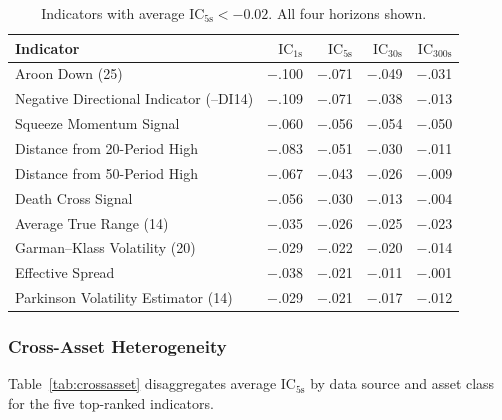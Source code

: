 \documentclass[12pt,a4paper]{article}
\theoremstyle{definition}
\theoremstyle{remark}
\newcommand{\IC}{\mathrm{IC}}
\begin{document}
\begin{table}[H]
\centering
\caption{Indicators with average $\IC_{5\text{s}} < -0.02$.
  All four horizons shown.}
\label{tab:negIC}
\small
{}
\begin{tabular}{lrrrr}
\toprule
\textbf{Indicator} & $\IC_{1\text{s}}$ & $\IC_{5\text{s}}$
  & $\IC_{30\text{s}}$ & $\IC_{300\text{s}}$ \\
\midrule
Aroon Down (25)   & $-$.100 & $-$.071 & $-$.049 & $-$.031 \\
Negative Directional Indicator (--DI14)           & $-$.109 & $-$.071 & $-$.038 & $-$.013 \\
Squeeze Momentum Signal   & $-$.060 & $-$.056 & $-$.054 & $-$.050 \\
Distance from 20-Period High    & $-$.083 & $-$.051 & $-$.030 & $-$.011 \\
Distance from 50-Period High    & $-$.067 & $-$.043 & $-$.026 & $-$.009 \\
Death Cross Signal      & $-$.056 & $-$.030 & $-$.013 & $-$.004 \\
Average True Range (14)           & $-$.035 & $-$.026 & $-$.025 & $-$.023 \\
Garman--Klass Volatility (20) & $-$.029 & $-$.022 & $-$.020 & $-$.014 \\
Effective Spread & $-$.038 & $-$.021 & $-$.011 & $-$.001 \\
Parkinson Volatility Estimator (14)& $-$.029 & $-$.021 & $-$.017 & $-$.012 \\
\bottomrule
\end{tabular}
\end{table}

\subsubsection{Cross-Asset Heterogeneity}

Table~\ref{tab:crossasset} disaggregates average $\IC_{5\text{s}}$
by data source and asset class for the five top-ranked indicators.
\end{document}
